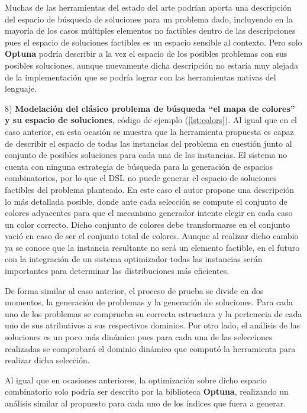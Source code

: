 Muchas de las herramientas del estado del arte podrían aporta una descripción del espacio de búsqueda de soluciones para un problema
dado, incluyendo en la mayoría de los casos múltiples elementos no factibles dentro de las descripciones pues el espacio de
soluciones factibles es un espacio sensible al contexto. Pero solo {\bf Optuna} podría describir a la vez el espacio de los posibles
problemas con sus posibles soluciones, aunque nuevamente dicha descripción no estaría muy alejada de la implementación que se podría
lograr con las herramientas nativas del lenguaje.

8) {\bf Modelación del clásico problema de búsqueda “el mapa de colores” y su espacio de soluciones}, código de ejemplo (\ref{lst:colors}). Al igual que en el caso anterior,
en esta ocasión se muestra que la herramienta propuesta es capaz de describir el espacio de todas las instancias del problema en
cuestión junto al conjunto de posibles soluciones para cada una de las instancias. El sistema no cuenta con ninguna estrategia de búsqueda 
para la generación de espacios combinatorios, por lo que el DSL no puede generar el espacio de soluciones factibles del problema planteado. 
En este caso el autor propone una descripción lo más detallada posible, donde ante cada selección se compute el conjunto de colores 
adyacentes para que el mecanismo generador intente elegir en cada caso un color correcto. Dicho conjunto de colores debe transformarse 
en el conjunto vació en caso de ser el conjunto total de colores. Aunque al realizar dicho cambio ya se conoce que la instancia resultante 
no será un elemento factible, en el futuro con la integración de un sistema optimizador todas las instancias serán importantes para 
determinar las distribuciones más eficientes.

De forma similar al caso anterior, el proceso de prueba se divide en dos momentos, la generación de problemas y la generación de
soluciones. Para cada uno de los problemas se comprueba su correcta estructura y la pertenecia de cada uno de sus atributivos a sus
respectivos dominios. Por otro lado, el análisis de las soluciones es un poco más dinámico pues para cada una de las selecciones
realizadas se comprobará el dominio dinámico que computó la herramienta para realizar dicha selección.

Al igual que en ocasiones anteriores, la optimización sobre dicho espacio combinatorio solo podría ser descrito por la biblioteca
      {\bf Optuna}, realizando un análisis similar al propuesto para cada uno de los índices que fuera a generar.

